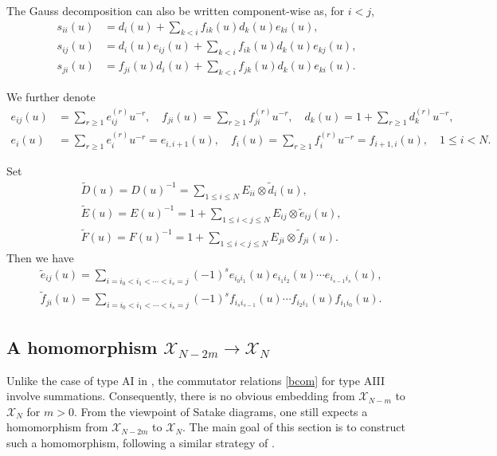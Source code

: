 \documentclass[11pt,reqno]{amsart}
\numberwithin{equation}{section}
\theoremstyle{definition}
\theoremstyle{remark}
\newcommand{\beq}{\begin{equation}}
\newcommand{\eeq}{\end{equation}}
\newcommand{\tl}{\tilde}
\newcommand{\wtl}{\widetilde}
\newcommand{\gge}{\geqslant}
\newcommand{\lle}{\leqslant}
\newcommand{\scrX}{{\mathscr{X}}}
\begin{document}
The Gauss decomposition can also be written component-wise as, for $i<j$, 
\begin{align}
s_{ii}(u)&=d_i(u)+\sum_{k<i}f_{ik}(u)d_k(u)e_{ki}(u),\nonumber\\
s_{ij}(u)&=d_i(u)e_{ij}(u)+\sum_{k<i}f_{ik}(u)d_k(u)e_{kj}(u),\label{eq:sij-Gauss}\\
s_{ji}(u)&=f_{ji}(u)d_i(u)+\sum_{k<i}f_{jk}(u)d_k(u)e_{ki}(u).\nonumber
\end{align}

We further denote
\begin{align}
    \label{gauss-gen}
e_{ij}(u) &=\sum_{r\gge 1}e_{ij}^{(r)}u^{-r},\quad f_{ji}(u)=\sum_{r\gge 1}f_{ji}^{(r)}u^{-r},\quad d_k(u)=1+\sum_{r\gge 1}d_{k}^{(r)}u^{-r},
\\
e_i(u) &=\sum_{r\gge 1}e_{i}^{(r)}u^{-r}=e_{i,i+1}(u),\quad f_i(u)=\sum_{r\gge 1}f_{i}^{(r)}u^{-r}=f_{i+1,i}(u),\quad 1\lle i<N.
\end{align}

Set 
\beq\label{edfinv}
\begin{split}
&\wtl D(u)=D(u)^{-1}=\sum_{1\lle i\lle N} E_{ii}\otimes \tl d_{i}(u),
\\
&\wtl E(u)=E(u)^{-1}=1+\sum_{1\lle i<j\lle N}E_{ij}\otimes \tl e_{ij}(u),\\
&\wtl F(u)=F(u)^{-1}=1+\sum_{1\lle i<j\lle N}E_{ji}\otimes \tl f_{ji}(u).
\end{split}
\eeq
Then we have 
\beq\label{eq:def-tilde-e-f}
\begin{split}
&\tl e_{ij}(u)=\sum_{i=i_0<i_1<\cdots<i_s=j}(-1)^s e_{i_0i_1}(u)e_{i_1i_2}(u)\cdots e_{i_{s-1}i_s}(u),\\
&\tl f_{ji}(u)=\sum_{i=i_0<i_1<\cdots<i_s=j}(-1)^s f_{i_{s}i_{s-1}}(u)\cdots f_{i_2i_1}(u) f_{i_1i_0}(u).
\end{split}
\eeq

\subsection{A homomorphism $\scrX_{N-2m}\to \scrX_{N}$}

Unlike the case of type AI in \cite{KLWZ23a}, the commutator relations \eqref{bcom} for type AIII involve summations. Consequently, there is no obvious embedding from $\scrX_{N-m}$ to $\scrX_{N}$ for $m>0$. From the viewpoint of Satake diagrams, one still expects a homomorphism from $\scrX_{N-2m}$ to $\scrX_{N}$. The main goal of this section is to construct such a homomorphism, following a similar strategy of \cite[\S3]{JLM18}.
\end{document}
